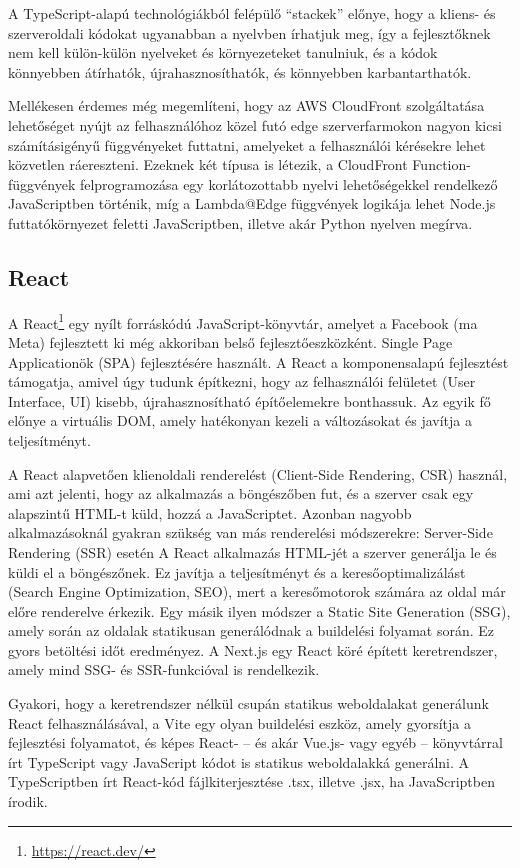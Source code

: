 A TypeScript-alapú technológiákból felépülő ``stackek'' előnye, hogy a kliens- és szerveroldali kódokat ugyanabban a nyelvben írhatjuk meg, így a fejlesztőknek nem kell külön-külön nyelveket és környezeteket tanulniuk, és a kódok könnyebben átírhatók, újrahasznosíthatók, és könnyebben karbantarthatók.

Mellékesen érdemes még megemlíteni, hogy az AWS CloudFront szolgáltatása lehetőséget nyújt az felhasználóhoz közel futó edge szerverfarmokon nagyon kicsi számításigényű függvényeket futtatni, amelyeket a felhasználói kérésekre lehet közvetlen ráereszteni. Ezeknek két típusa is létezik, a CloudFront Function-függvények felprogramozása egy korlátozottabb nyelvi lehetőségekkel rendelkező JavaScriptben történik, míg a Lambda@Edge függvények logikája lehet Node.js futtatókörnyezet feletti JavaScriptben, illetve akár Python nyelven megírva.

\subsection{React}

A React\footnote{\url{https://react.dev/}} egy nyílt forráskódú JavaScript-könyvtár, amelyet a Facebook (ma Meta) fejlesztett ki még akkoriban belső fejlesztőeszközként. Single Page Applicationök (SPA) fejlesztésére használt. A React a komponensalapú fejlesztést támogatja, amivel úgy tudunk építkezni, hogy az felhasználói felületet (User Interface, UI) kisebb, újrahasznosítható építőelemekre bonthassuk. Az egyik fő előnye a virtuális DOM, amely hatékonyan kezeli a változásokat és javítja a teljesítményt.

A React alapvetően klienoldali renderelést (Client-Side Rendering, CSR) használ, ami azt jelenti, hogy az alkalmazás a böngészőben fut, és a szerver csak egy alapszintű HTML-t küld, hozzá a JavaScriptet. Azonban nagyobb alkalmazásoknál gyakran szükség van más renderelési módszerekre: Server-Side Rendering (SSR) esetén A React alkalmazás HTML-jét a szerver generálja le és küldi el a böngészőnek. Ez javítja a teljesítményt és a keresőoptimalizálást (Search Engine Optimization, SEO), mert a keresőmotorok számára az oldal már előre renderelve érkezik. Egy másik ilyen módszer a Static Site Generation (SSG), amely során az oldalak statikusan generálódnak a buildelési folyamat során. Ez gyors betöltési időt eredményez. A Next.js egy React köré épített keretrendszer, amely mind SSG- és SSR-funkcióval is rendelkezik.

Gyakori, hogy a keretrendszer nélkül csupán statikus weboldalakat generálunk React felhasználásával, a Vite egy olyan buildelési eszköz, amely gyorsítja a fejlesztési folyamatot, és képes React- -- és akár Vue.js- vagy egyéb -- könyvtárral írt TypeScript vagy JavaScript kódot is statikus weboldalakká generálni. A TypeScriptben írt React-kód fájlkiterjesztése .tsx, illetve .jsx, ha JavaScriptben írodik.

